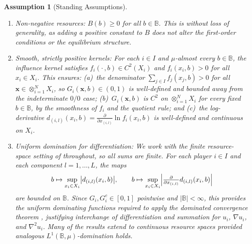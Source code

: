 \documentclass{article}
\newtheorem{assumption}{Assumption}
\begin{document}
        \begin{assumption}[Standing Assumptions]\label{ass:SI_standing}
            
            \begin{enumerate}[label=(\roman*)]
                \item\label{ass:SI_nonneg} Non-negative resources: $B(b) \geq 0$ for all $b \in \mathbb{B}$. This is without loss of generality, as adding a positive constant to $B$ does not alter the first-order conditions or the equilibrium structure.
                \item\label{ass:SI_f_smooth} Smooth, strictly positive kernels: For each $i \in I$ and $\mu$-almost every $b \in \mathbb{B}$, the influence kernel satisfies $f_i(\cdot\,,b) \in C^2(X_i)$ and $f_i(x_i,b) > 0$ for all $x_i \in X_i$. This ensures: (a)~the denominator $\sum_{j\in I}f_j(x_j,b) > 0$ for all $\mathbf{x}\in\otimes_{i=1}^N X_i$, so $G_i(\mathbf{x},b)\in(0,1)$ is well-defined and bounded away from the indeterminate $0/0$ case; (b)~$G_i(\mathbf{x},b)$ is $C^2$ on $\otimes_{i=1}^N X_i$ for every fixed $b\in\mathbb{B}$, by the smoothness of $f_i$ and the quotient rule; and (c)~the log-derivative $d_{(i,l)}(x_i,b)=\frac{\partial}{\partial x_{(i,l)}}\ln f_i(x_i,b)$ is well-defined and continuous on $X_i$.
                \item\label{ass:SI_integrability} Uniform domination for differentiation: We work with the finite resource-space setting of  throughout, so all sums are finite. For each player $i \in I$ and each component $l = 1,\ldots,L$, the maps
                \begin{equation*}
                    b \mapsto \sup_{x_i \in X_i}\bigl|d_{(i,l)}(x_i,b)\bigr|, \qquad
                    b \mapsto \sup_{x_i \in X_i}\Bigl|\tfrac{\partial}{\partial x_{(i,l)}}d_{(i,l)}(x_i,b)\Bigr|
                \end{equation*}
                are bounded on $\mathbb{B}$. Since $ G_i, G_i^c \in [0,1]$ pointwise and $|\mathbb{B}| < \infty$, this provides the uniform dominating functions required to apply the dominated convergence theorem \cite[Thm.~1.34]{rudin1987real}, justifying interchange of differentiation and summation for $u_i$, $\nabla u_i$, and $\nabla^2 u_i$. Many of the results extend to continuous resource spaces provided analogous $L^1(\mathbb{B},\mu)$-domination holds.
            \end{enumerate}
        \end{assumption}
    
\end{document}
